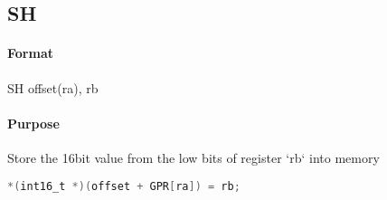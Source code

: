 \subsection{SH}


\paragraph{Format} SH offset(ra), rb

\paragraph{Purpose} Store the 16bit value from the low bits of register `rb` into memory

\begin{lstlisting}[language=C]
    *(int16_t *)(offset + GPR[ra]) = rb;
\end{lstlisting}